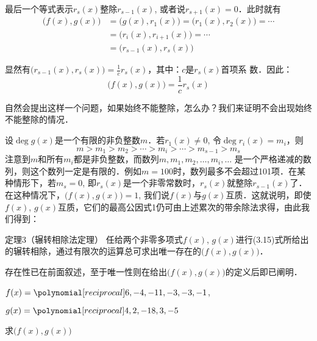 最后一个等式表示$r_s(x)$整除$r_{s-1}(x)$, 或者说$r_{s+1}(x)=0$．此时就有
\[\begin{split}
    \big(f(x), g(x)\big)&=\big(g(x),r_1(x)\big)=\big(r_1(x),r_2(x)\big)=\cdots\\
    &=\big(r_i(x),r_{i+1}(x)\big)=\cdots\\
    &=\big(r_{s-1}(x),r_s(x)\big)
\end{split}\]

显然有$\big(r_{s-1}(x),r_s(x)\big)=\frac{1}{c}r_s(x)$，其中：$c$是$r_s(x)$首项系
数．因此：
\[\big(f(x), g(x)\big)=\frac{1}{c}r_s(x)\]

自然会提出这样一个问题，如果始终不能整除，怎么办？我们来证明不会出现始终不能整除的情况．

设$\deg g(x)$是一个有限的非负整数$m$．若$r_1(x)\ne 0$, 令$\deg r_i(x)=m_i$，则
\[m>m_1>m_2>\cdots>m_i>\cdots>m_{s-1}>m_s\]
注意到$m$和所有$m_i$都是非负整数，而数列$m,m_1,m_2,\ldots,m_i,\ldots$
是一个严格递减的数列，则这个数列一定是有限的．例如$m=100$时，数列最多不会超过101项．在某种情形下，若$m_s=0$, 即$r_s(x)$是一个非零常数时，$r_s(x)$就整除$r_{s-1}(x)$了．在这种情况下，$\big(f(x),g(x)\big)=1$, 我们说$f(x)$与$g(x)$互质．这就说明，即使$f(x)$, $g(x)$互质，它们的最高公因式1仍可由上述累次的带余除法求得，由此我们得到：

\begin{blk}{定理3（辗转相除法定理）}
  任给两个非零多项式$f(x)$, $g(x)$进行(3.15)式所给出的辗转相除，通过有限次的运算总可求出唯一存在的$\big(f(x),g(x)\big)$．
\end{blk}

 存在性已在前面叙述，至于唯一性则在给出$\big(f(x),g(x)\big)$的定义后即已阐明．  

\begin{example}
$f(x)=\poly{6,-4,-11,-3,-3,-1}$, 

$g(x)=\poly{4,2,-18,3,-5}$

求$\big(f(x),g(x)\big)$
\end{example}

